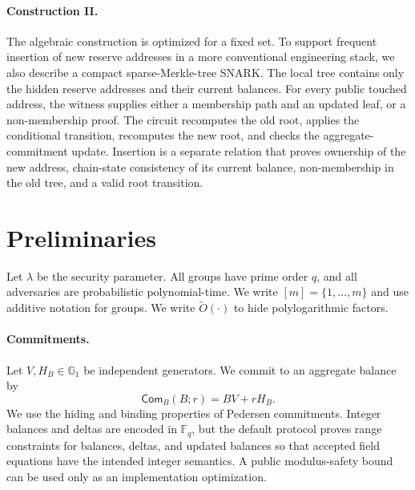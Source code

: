 \documentclass[runningheads]{llncs}
\newcommand{\F}{\mathbb{F}}
\newcommand{\G}{\mathbb{G}}
\newcommand{\Com}{\mathsf{Com}}
\newcommand{\softO}{\widetilde{O}}
\begin{document}
\paragraph{Construction II.}
The algebraic construction is optimized for a fixed set.  To support frequent insertion of new reserve addresses in a more conventional engineering stack, we also describe a compact sparse-Merkle-tree SNARK.  The local tree contains only the hidden reserve addresses and their current balances.  For every public touched address, the witness supplies either a membership path and an updated leaf, or a non-membership proof.  The circuit recomputes the old root, applies the conditional transition, recomputes the new root, and checks the aggregate-commitment update.  Insertion is a separate relation that proves ownership of the new address, chain-state consistency of its current balance, non-membership in the old tree, and a valid root transition.

\section{Preliminaries}

Let \(\lambda\) be the security parameter.  All groups have prime order \(q\), and all adversaries are probabilistic polynomial-time.  We write \([m]=\{1,\ldots,m\}\) and use additive notation for groups.  We write \(\softO(\cdot)\) to hide polylogarithmic factors.

\paragraph{Commitments.}
Let \(V,H_B\in\G_1\) be independent generators.  We commit to an aggregate balance by
\[
        \Com_B(B;r)=B V+rH_B.
\]
We use the hiding and binding properties of Pedersen commitments.  Integer balances and deltas are encoded in \(\F_q\), but the default protocol proves range constraints for balances, deltas, and updated balances so that accepted field equations have the intended integer semantics.  A public modulus-safety bound can be used only as an implementation optimization.
\end{document}

